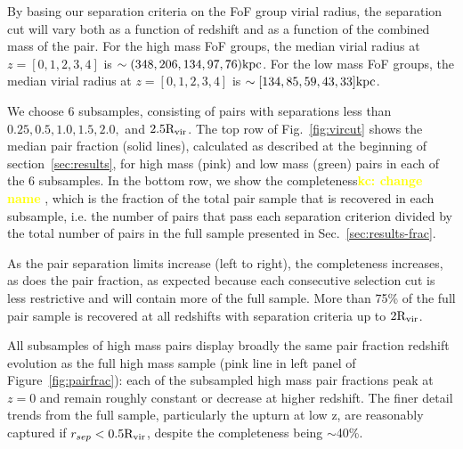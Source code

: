 \documentclass[twocolumn]{aastex631}
\newcommand{\kc}[1]{\textcolor{yellow}{\textbf{kc: #1}} }
\newcommand{\Rvir}{\ensuremath{\rm R_{vir}}}
\begin{document}
    By basing our separation criteria on the FoF group virial radius, the separation cut will vary both as a function of redshift and as a function of the combined mass of the pair.
    For the high mass FoF groups, the median virial radius at $z=[0,1,2,3,4]$ is $\sim(348, 206, 134, 97, 76)\mathrm{kpc}$. 
    For the low mass FoF groups, the median virial radius at $z=[0,1,2,3,4]$ is $\sim[134, 85, 59, 43, 33]\mathrm{kpc}$.    
    
    We choose 6 subsamples, consisting of pairs with separations less than $0.25, 0.5, 1.0, 1.5, 2.0,$ and $2.5\Rvir$. 
    The top row of Fig.~\ref{fig:vircut} shows the median pair fraction (solid lines), calculated as described at the beginning of section~\ref{sec:results}, 
    for high mass (pink) and low mass (green) pairs in each of the 6 subsamples. 
    In the bottom row, we show the completeness\kc{change name}, which is the fraction of the total pair sample that is recovered in each subsample, i.e. the number of pairs that pass each separation criterion divided by the total number of pairs in the full sample presented in Sec.~\ref{sec:results-frac}.

    As the pair separation limits increase (left to right), the completeness increases, as does the pair fraction, as expected because each consecutive selection cut is less restrictive and will contain more of the full sample. 
    More than 75\% of the full pair sample is recovered at all redshifts with separation criteria up to $2\Rvir$.

    All subsamples of high mass pairs display broadly the same pair fraction redshift evolution as the full high mass sample (pink line in left panel of Figure~\ref{fig:pairfrac}): each of the subsampled high mass pair fractions peak at $z=0$ and remain roughly constant or decrease at higher redshift. 
    The finer detail trends from the full sample, particularly the upturn at low z, are reasonably captured if $r_{sep} < 0.5 \Rvir$, despite the completeness being $\sim$40\%. 
\end{document}
